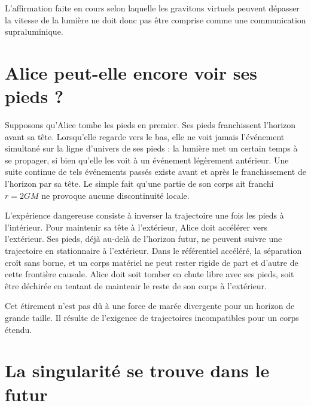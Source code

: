 L’affirmation faite en cours selon laquelle les gravitons virtuels peuvent dépasser la vitesse de la lumière ne doit donc pas être comprise comme une communication supraluminique.

\section{Alice peut-elle encore voir ses pieds ?}

Supposons qu’Alice tombe les pieds en premier. Ses pieds franchissent l’horizon avant sa tête. Lorsqu’elle regarde vers le bas, elle ne voit jamais l’événement simultané sur la ligne d’univers de ses pieds : la lumière met un certain temps à se propager, si bien qu’elle les voit à un événement légèrement antérieur. Une suite continue de tels événements passés existe avant et après le franchissement de l’horizon par sa tête. Le simple fait qu’une partie de son corps ait franchi \(r=2GM\) ne provoque aucune discontinuité locale.

L’expérience dangereuse consiste à inverser la trajectoire une fois les pieds à l’intérieur. Pour maintenir sa tête à l’extérieur, Alice doit accélérer vers l’extérieur. Ses pieds, déjà au-delà de l’horizon futur, ne peuvent suivre une trajectoire en stationnaire à l’extérieur. Dans le référentiel accéléré, la séparation croît sans borne, et un corps matériel ne peut rester rigide de part et d’autre de cette frontière causale. Alice doit soit tomber en chute libre avec ses pieds, soit être déchirée en tentant de maintenir le reste de son corps à l’extérieur.

Cet étirement n’est pas dû à une force de marée divergente pour un horizon de grande taille. Il résulte de l’exigence de trajectoires incompatibles pour un corps étendu.

\section{La singularité se trouve dans le futur}

